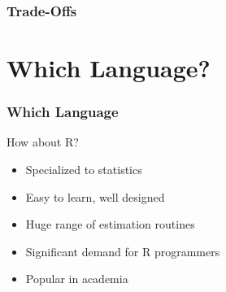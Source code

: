 \begin{frame}
    \frametitle{Trade-Offs}

    \begin{figure}
       \begin{center}
       \end{center}
    \end{figure}

\end{frame}




\section{Which Language?}


\begin{frame}
    \frametitle{Which Language}


    How about R?
    \vspace{0.5em}

    \begin{itemize}
        \item Specialized to statistics
            \vspace{0.5em}
        \item Easy to learn, well designed
            \vspace{0.5em}
        \item Huge range of estimation routines
            \vspace{0.5em}
        \item Significant demand for R programmers
            \vspace{0.5em}
        \item Popular in academia 
    \end{itemize}

\end{frame}



